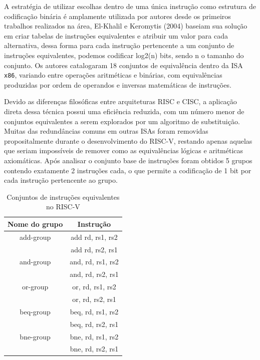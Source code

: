 A estratégia de utilizar escolhas dentro de uma única instrução como estrutura de codificação binária é amplamente utilizada por autores desde os primeiros trabalhos realizados na área, El-Khalil e Keromytis (2004) baseiam sua solução em criar tabelas de instruções equivalentes e atribuir um valor para cada alternativa, dessa forma para cada instrução pertencente a um conjunto de instruções equivalentes, podemos codificar log2(n) bits, sendo n o tamanho do conjunto. Os autores catalogaram 18 conjuntos de equivalência dentro da ISA \texttt{x86}, variando entre operações aritméticas e binárias, com equivalências produzidas por ordem de operandos e inversas matemáticas de instruções.

Devido as diferenças filosóficas entre arquiteturas RISC e CISC, a aplicação direta dessa técnica possui uma eficiência reduzida, com um número menor de conjuntos equivalentes a serem explorados por um algoritmo de substituição. Muitas das redundâncias comuns em outras ISAs foram removidas propositalmente durante o desenvolvimento do RISC-V, restando apenas aquelas que seriam impossíveis de remover como as equivalências lógicas e aritméticas axiomáticas. Após analisar o conjunto base de instruções foram obtidos 5 grupos contendo exatamente 2 instruções cada, o que permite a codificação de 1 bit por cada instrução pertencente ao grupo.

\begin{table}[!htb]
    \centering
    
    \begin{tabular}{|c|c|}
        \hline
        Nome do grupo & Instrução  \\
        \hline
        \hline
        add-group & add rd, rs1, rs2 \\
                  \hline
                  & add rd, rs2, rs1 \\
        \hline
        and-group & and, rd, rs1, rs2 \\
                  \hline
                  & and, rd, rs2, rs1 \\
        \hline
        or-group & or, rd, rs1, rs2 \\
                  \hline
                  & or, rd, rs2, rs1 \\
        \hline
        beq-group & beq, rd, rs1, rs2 \\
                  \hline
                  & beq, rd, rs2, rs1 \\
        \hline
        bne-group & bne, rd, rs1, rs2 \\
                  \hline
                  & bne, rd, rs2, rs1 \\
        \hline
    \end{tabular}
    \caption{Conjuntos de instruções equivalentes no RISC-V}
    \label{tab:equiv_sets}
\end{table}

